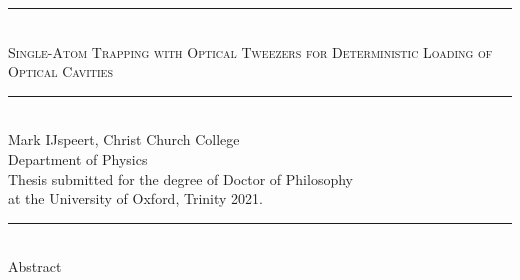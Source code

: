 \documentclass[../Thesis-IJspeert.tex]{subfiles}
\begin{document}
\newlength{\smalldrop}%
\cleardoublepage
\thispagestyle{empty}
\baselineskip

\begin{center}

\rule[\baselineskip]{\textwidth}{1pt}\\[-0.5\baselineskip]

{\Large \textsc{Single-Atom Trapping with Optical Tweezers for Deterministic Loading of Optical Cavities}}\\[0.5\baselineskip]

\rule[\baselineskip]{0.8\textwidth}{0.5pt}\\[-\baselineskip]

Mark IJspeert, Christ Church College\\
Department of Physics\\[0.3\baselineskip]

Thesis submitted for the degree of Doctor of Philosophy\\at the University of Oxford, Trinity 2021.\\[0.5\baselineskip]

\rule[\baselineskip]{\textwidth}{1pt}\\[-0.3\baselineskip]
\vspace{2em}
{\Large Abstract}\\[0.5\baselineskip]

\end{center}
\end{document}

